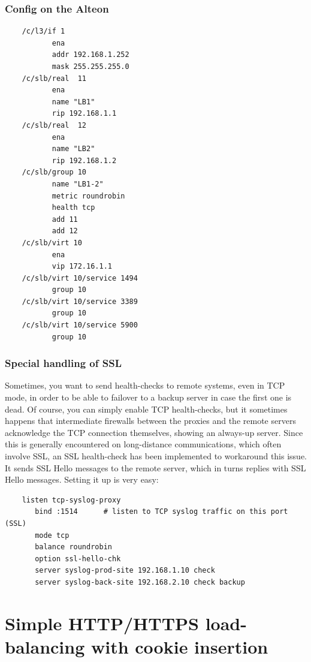 \subsubsection{Config on the Alteon}

\begin{verbatim}
    /c/l3/if 1
           ena
           addr 192.168.1.252
           mask 255.255.255.0
    /c/slb/real  11
           ena
           name "LB1"
           rip 192.168.1.1
    /c/slb/real  12
           ena
           name "LB2"
           rip 192.168.1.2
    /c/slb/group 10
           name "LB1-2"
           metric roundrobin
           health tcp
           add 11
           add 12
    /c/slb/virt 10
           ena
           vip 172.16.1.1
    /c/slb/virt 10/service 1494
           group 10
    /c/slb/virt 10/service 3389
           group 10
    /c/slb/virt 10/service 5900
           group 10
\end{verbatim}

\subsubsection{Special handling of SSL}

Sometimes, you want to send health-checks to remote systems, even in TCP mode,
in order to be able to failover to a backup server in case the first one is
dead. Of course, you can simply enable TCP health-checks, but it sometimes
happens that intermediate firewalls between the proxies and the remote servers
acknowledge the TCP connection themselves, showing an always-up server. Since
this is generally encountered on long-distance communications, which often
involve SSL, an SSL health-check has been implemented to workaround this issue.
It sends SSL Hello messages to the remote server, which in turns replies with
SSL Hello messages. Setting it up is very easy:

\begin{verbatim}
    listen tcp-syslog-proxy
       bind :1514      # listen to TCP syslog traffic on this port (SSL)
       mode tcp
       balance roundrobin
       option ssl-hello-chk
       server syslog-prod-site 192.168.1.10 check
       server syslog-back-site 192.168.2.10 check backup
\end{verbatim}


\section{Simple HTTP/HTTPS load-balancing with cookie insertion}
\label{sec:simple_http_https_load_balancing_with_cookie_insertion}

